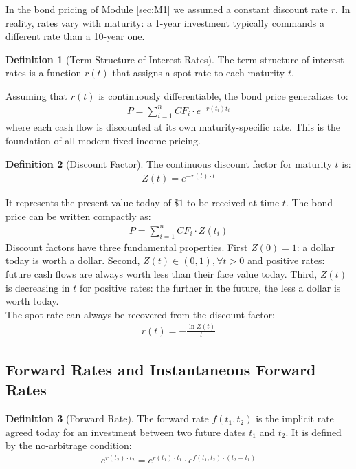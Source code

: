 \documentclass{article}
\theoremstyle{definition}  %
\newtheorem{definition}{Definition}[section]
\theoremstyle{plain}  %
\numberwithin{definition}{section}
\numberwithin{proposition}{section}
\numberwithin{theorem}{section}
\numberwithin{equation}{section}
\begin{document}
In the bond pricing of Module \ref{sec:M1} we assumed a constant discount rate $r$. In reality, rates vary with maturity: a 1-year investment typically commands a different rate than a 10-year one.

\begin{definition}[Term Structure of Interest Rates] \label{def:termstructure}
    The term structure of interest rates is a function $r(t)$ that assigns a spot rate to each maturity $t$.
\end{definition}
Assuming that $r(t)$ is continuously differentiable, the bond price generalizes to:
\begin{align*}
    P = \sum_{i = 1}^{n} CF_{i} \cdot e^{-r(t_{i}) t_{i}}
\end{align*}
where each cash flow is discounted at its own maturity-specific rate. This is the foundation of all modern fixed income pricing.

\begin{definition}[Discount Factor]
    The continuous discount factor for maturity $t$ is:
    \begin{align*}
        Z(t) = e^{-r(t) \cdot t}
    \end{align*}
\end{definition}
It represents the present value today of $\$1$ to be received at time $t$. The bond price can be written compactly as:
\begin{align*}
    P = \sum_{i = 1}^{n} CF_{i} \cdot Z(t_{i})
\end{align*}
Discount factors have three fundamental properties. First $Z(0) = 1$: a dollar today is worth a dollar. Second, $Z(t) \in (0, 1), \forall t > 0$ and positive rates: future cash flows are always worth less than their face value today. Third, $Z(t)$ is decreasing in $t$ for positive rates: the further in the future, the less a dollar is worth today. \\
The spot rate can always be recovered from the discount factor:
\begin{align*}
    r(t) = - \frac{\ln Z(t)}{t}
\end{align*}

\subsection{Forward Rates and Instantaneous Forward Rates}
\label{subsec:fwdrates}

\begin{definition}[Forward Rate]
    The forward rate $f(t_1, t_2)$ is the implicit rate agreed today for an investment between two future dates $t_{1}$ and $t_{2}$. It is defined by the no-arbitrage condition:
    \begin{align*}
        e^{r(t_2) \cdot t_2} = e^{r(t_1) \cdot t_1} \cdot e^{f(t_1, t_2) \cdot (t_2 - t_1)}
    \end{align*}
\end{definition}
\end{document}
